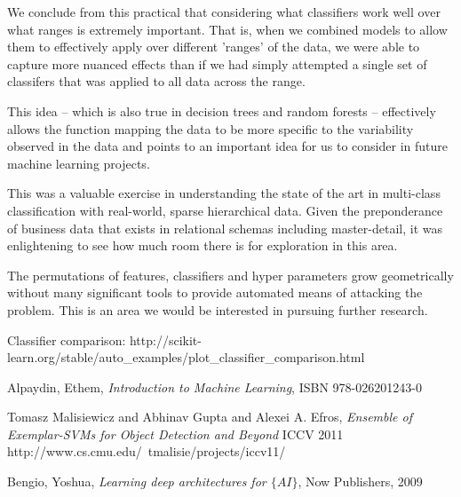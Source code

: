 \documentclass[11pt, oneside]{article}   	%
\begin{document}
We conclude from this practical that considering what classifiers work well over what ranges is extremely important. That is, when we combined models to allow them to effectively apply over different 'ranges' of the data, we were able to capture more nuanced effects than if we had simply attempted a single set of classifers that was applied to all data across the range. 

This idea -- which is also true in decision trees and random forests -- effectively allows the function mapping the data to be more specific to the variability observed in the data and points to an important idea for us to consider in future machine learning projects.

This was a valuable exercise in understanding the state of the art in multi-class classification with real-world, sparse hierarchical data. Given the preponderance of business data that exists in relational schemas including master-detail, it was enlightening to see how much room there is for exploration in this area.

The permutations of features, classifiers and hyper parameters grow geometrically without many significant tools to provide automated means of attacking the problem. This is an area we would be interested in pursuing further research.

\begin{thebibliography}{1}

  Classifier comparison:
  http://scikit-learn.org/stable/auto\_examples/plot\_classifier\_comparison.html
  
   Alpaydin, Ethem, \emph{Introduction to Machine Learning}, ISBN 978-026201243-0

  Tomasz Malisiewicz and Abhinav Gupta and Alexei A. Efros, \emph{Ensemble of Exemplar-SVMs for Object Detection and Beyond} ICCV 2011 http://www.cs.cmu.edu/~tmalisie/projects/iccv11/

  Bengio, Yoshua, \emph{Learning deep architectures for $\{AI\}$}, Now Publishers, 2009

  \end{thebibliography}
\end{document}
